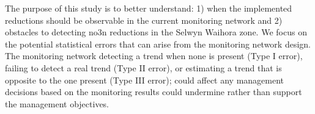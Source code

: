 The purpose of this study is to better understand: 1) when the implemented reductions should be observable in the current monitoring network and 2) obstacles to detecting \gls{no3n} reductions in the Selwyn Waihora zone.
We focus on the potential statistical errors that can arise from the monitoring network design.
The monitoring network detecting a trend when none is present (Type I error), failing to detect a real trend (Type II error), or estimating a trend that is opposite to the one present (Type III error); could affect any management decisions based on the monitoring results could undermine rather than support the management objectives.
